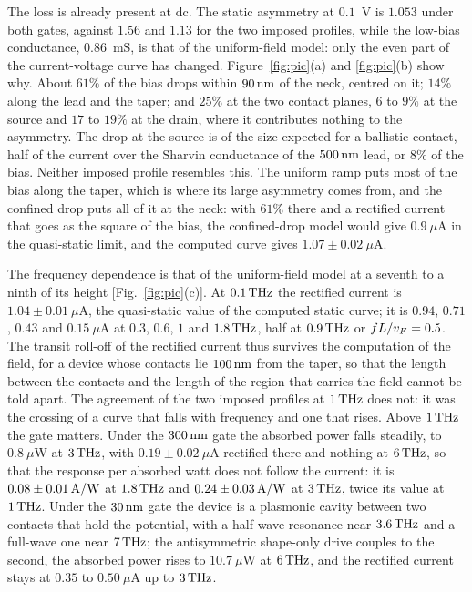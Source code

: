 The loss is already present at dc. The static asymmetry at $0.1$~V is
$1.053$ under both gates, against $1.56$ and $1.13$ for the two imposed
profiles, while the low-bias conductance, $0.86$~mS, is that of the uniform-field
model: only the even part of the current-voltage curve has changed.
Figure~\ref{fig:pic}(a) and \ref{fig:pic}(b) show why. About $61\%$ of the
bias drops within $90\,\mathrm{nm}$ of the neck, centred on it; $14\%$ along the
lead and the taper; and $25\%$ at the two contact planes, $6$ to $9\%$ at
the source and $17$ to $19\%$ at the drain, where it contributes nothing
to the asymmetry. The drop at the source is of the size expected for a
ballistic contact, half of the current over the Sharvin conductance of
the $500\,\mathrm{nm}$ lead, or $8\%$ of the bias. Neither imposed profile
resembles this. The uniform ramp puts most of the bias along the taper,
which is where its large asymmetry comes from, and the confined drop puts
all of it at the neck: with $61\%$ there and a rectified current that goes
as the square of the bias, the confined-drop model would give
$0.9\ \mu$A in the quasi-static limit, and the computed curve gives
$1.07\pm0.02\ \mu$A.

The frequency dependence is that of the uniform-field model at a seventh
to a ninth of its height [Fig.~\ref{fig:pic}(c)]. At $0.1\,\mathrm{THz}$ the
rectified current is $1.04\pm0.01\ \mu$A, the quasi-static value of the
computed static curve; it is $0.94$, $0.71$, $0.43$ and $0.15\ \mu$A at
$0.3$, $0.6$, $1$ and $1.8\,\mathrm{THz}$, half at $0.9\,\mathrm{THz}$ or $fL/v_{F}=0.5$. The
transit roll-off of the rectified current thus survives the computation
of the field, for a device whose contacts lie $100\,\mathrm{nm}$ from the taper, so
that the length between the contacts and the length of the region that
carries the field cannot be told apart. The agreement of the two imposed profiles at $1\,\mathrm{THz}$ does
not: it was the crossing of a curve that falls with frequency and one
that rises. Above $1\,\mathrm{THz}$ the
gate matters. Under the $300\,\mathrm{nm}$ gate the absorbed power falls steadily,
to $0.8\ \mu$W at $3\,\mathrm{THz}$, with $0.19\pm0.02\ \mu$A rectified there and
nothing at $6\,\mathrm{THz}$, so that the response per absorbed watt
does not follow the current: it is $0.08\pm0.01\,\mathrm{A/W}$ at $1.8\,\mathrm{THz}$ and
$0.24\pm0.03\,\mathrm{A/W}$ at $3\,\mathrm{THz}$, twice its value at $1\,\mathrm{THz}$. Under the $30\,\mathrm{nm}$ gate the device is a plasmonic
cavity between two contacts that hold the potential, with a half-wave
resonance near $3.6\,\mathrm{THz}$ and a full-wave one near $7\,\mathrm{THz}$; the antisymmetric shape-only drive couples to the
second, the absorbed power rises to $10.7\ \mu$W at $6\,\mathrm{THz}$, and the
rectified current stays at $0.35$ to $0.50\ \mu$A up to $3\,\mathrm{THz}$.

